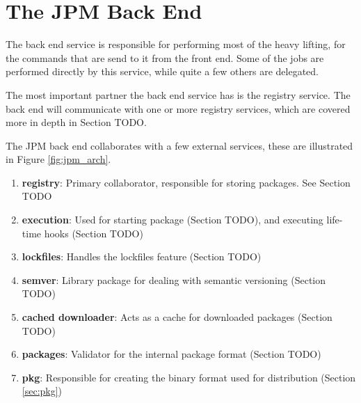 \section{The JPM Back End}

The back end service is responsible for performing most of the heavy lifting,
for the commands that are send to it from the front end. Some of the jobs
are performed directly by this service, while quite a few others are
delegated.

The most important partner the back end service has is the registry service.
The back end will communicate with one or more registry services, which are
covered more in depth in Section TODO.

The JPM back end collaborates with a few external services, these are
illustrated in Figure \ref{fig:jpm_arch}.

\begin{enumerate}

\item \textbf{registry}: Primary collaborator, responsible for storing
packages. See Section TODO

\item \textbf{execution}: Used for starting package (Section TODO), and
executing life-time hooks (Section TODO)

\item \textbf{lockfiles}: Handles the lockfiles feature (Section TODO)

\item \textbf{semver}: Library package for dealing with semantic versioning
(Section TODO)

\item \textbf{cached downloader}: Acts as a cache for downloaded packages
(Section TODO)

\item \textbf{packages}: Validator for the internal package format (Section
TODO)

\item \textbf{pkg}: Responsible for creating the binary format used for
distribution (Section \ref{sec:pkg})

\end{enumerate}


